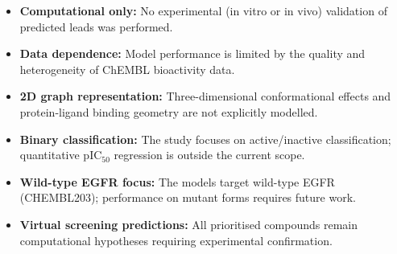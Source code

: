 \begin{itemize}
    \item \textbf{Computational only:} No experimental (in vitro or in vivo) validation of predicted leads was performed.
    \item \textbf{Data dependence:} Model performance is limited by the quality and heterogeneity of ChEMBL bioactivity data.
    \item \textbf{2D graph representation:} Three-dimensional conformational effects and protein-ligand binding geometry are not explicitly modelled.
    \item \textbf{Binary classification:} The study focuses on active/inactive classification; quantitative pIC$_{50}$ regression is outside the current scope.
    \item \textbf{Wild-type EGFR focus:} The models target wild-type EGFR (CHEMBL203); performance on mutant forms requires future work.
    \item \textbf{Virtual screening predictions:} All prioritised compounds remain computational hypotheses requiring experimental confirmation.
\end{itemize}

\newpage

